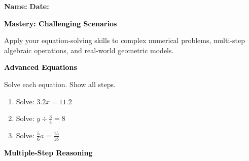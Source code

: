 \documentclass[12pt, letterpaper, fleqn]{article}
\begin{document}
\textbf{Name:} \underline{\hspace{5cm}}
\hfill
\textbf{Date:} \underline{\hspace{3cm}}\\

\begin{tcolorbox}[colback=black!10]
    \large\textcolor{black}{\textbf{Mastery: Challenging Scenarios}}
\end{tcolorbox}

\vspace{3mm}
\noindent
Apply your equation-solving skills to complex numerical problems, multi-step algebraic operations, and real-world geometric models.

\vspace{4mm}

\begin{tcolorbox}[colback=black!10]
\large\textcolor{black}{\textbf{Advanced Equations}}
\end{tcolorbox}

\noindent
Solve each equation. Show all steps.

\vspace{3mm}

\begin{enumerate}[itemsep=2.2cm, leftmargin=0.6cm]

\item Solve: $3.2x = 11.2$

\vspace{2cm}

\item Solve: $y \div \frac{3}{4} = 8$

\vspace{2cm}

\item Solve: $\frac{5}{6}a = \frac{15}{18}$

\vspace{2cm}

\end{enumerate}

\newpage

\begin{tcolorbox}[colback=black!10]
\large\textcolor{black}{\textbf{Multiple-Step Reasoning}}
\end{tcolorbox}
\end{document}
